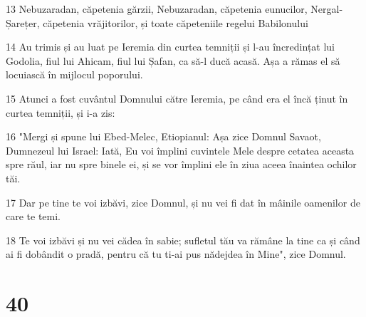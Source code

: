 \par 13 Nebuzaradan, căpetenia gărzii, Nebuzaradan, căpetenia eunucilor, Nergal-Șarețer, căpetenia vrăjitorilor, și toate căpeteniile regelui Babilonului
\par 14 Au trimis și au luat pe Ieremia din curtea temniții și l-au încredințat lui Godolia, fiul lui Ahicam, fiul lui Șafan, ca să-l ducă acasă. Așa a rămas el să locuiască în mijlocul poporului.
\par 15 Atunci a fost cuvântul Domnului către Ieremia, pe când era el încă ținut în curtea temniții, și i-a zis:
\par 16 "Mergi și spune lui Ebed-Melec, Etiopianul: Așa zice Domnul Savaot, Dumnezeul lui Israel: Iată, Eu voi împlini cuvintele Mele despre cetatea aceasta spre răul, iar nu spre binele ei, și se vor împlini ele în ziua aceea înaintea ochilor tăi.
\par 17 Dar pe tine te voi izbăvi, zice Domnul, și nu vei fi dat în mâinile oamenilor de care te temi.
\par 18 Te voi izbăvi și nu vei cădea în sabie; sufletul tău va rămâne la tine ca și când ai fi dobândit o pradă, pentru că tu ti-ai pus nădejdea în Mine", zice Domnul.

\chapter{40}

